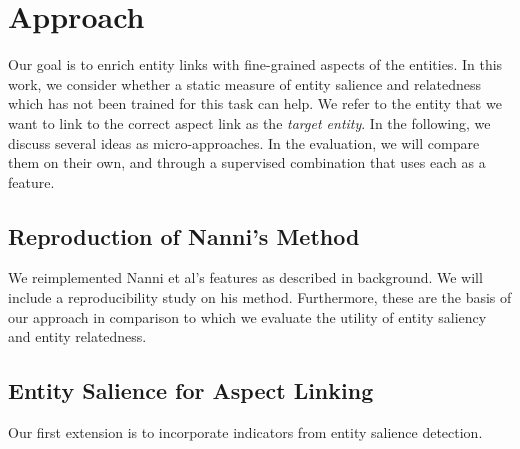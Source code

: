\section{Approach}
\label{sec:Approach}
Our goal is to enrich entity links with fine-grained aspects of the entities. In this work, we consider whether a static measure of entity salience and relatedness which has not been trained for this task can help.  We refer to the entity that we want to link to the correct aspect link as the \emph{target entity}. In the following, we discuss several ideas as micro-approaches. In the evaluation, we will compare them on their own, and through a supervised combination that uses each as a feature.




\subsection{Reproduction of Nanni's Method}

We reimplemented Nanni et al's features as described in background. We will include a reproducibility study on his method. Furthermore, these are the basis of our approach in comparison to which we evaluate the utility of entity saliency and entity relatedness.





\subsection{Entity Salience for Aspect Linking}
\label{subsec:Entity Salience for Aspect Linking}
Our first extension is to incorporate indicators from entity salience detection.

